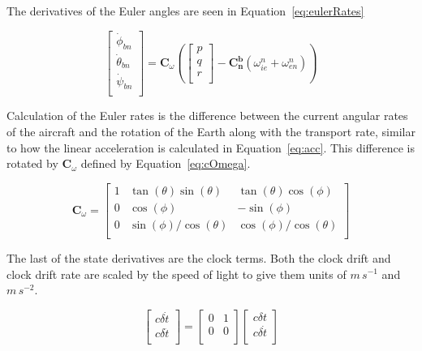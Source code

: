 The derivatives of the Euler angles are seen in Equation~\ref{eq:eulerRates}

\begin{equation}\label{eq:eulerRates}
    \begin{bmatrix}
        \dot{\phi}_{bn}   \\
        \dot{\theta}_{bn} \\
        \dot{\psi}_{bn}   \\
    \end{bmatrix} =
    \mathbf{C}_{\omega}
    \left(
    \begin{bmatrix}
            p \\
            q \\
            r \\
        \end{bmatrix} -
    \mathbf{C_n^b}\left(\omega_{ie}^n + \omega_{en}^n\right)
    \right)
\end{equation}

Calculation of the Euler rates is the difference between the current angular rates of the aircraft and the rotation of the Earth along with the transport rate, similar to how the linear acceleration is calculated in Equation~\ref{eq:acc}. This difference is rotated by \(\mathbf{C}_{\omega}\) defined by Equation~\ref{eq:cOmega}.

\begin{equation}\label{eq:cOmega}
    \mathbf{C}_{\omega} =
    \begin{bmatrix}
        1 & \tan(\theta)\sin(\theta)    & \tan(\theta)\cos(\phi)      \\
        0 & \cos(\phi)                  & -\sin(\phi)                 \\
        0 & {\sin(\phi)}/{\cos(\theta)} & {\cos(\phi)}/{\cos(\theta)} \\
    \end{bmatrix}
\end{equation}

The last of the state derivatives are the clock terms. Both the clock drift and clock drift rate are scaled by the speed of light to give them units of \( m \, s^{-1}\) and \( m \, s^{-2}\).

\begin{equation}\label{eq:clkRates}
    \begin{bmatrix}
        c\delta \dot{t} \\
        c\delta\ddot{t} \\
    \end{bmatrix} =
    \begin{bmatrix}
        0 & 1 \\
        0 & 0 \\
    \end{bmatrix}
    \begin{bmatrix}
        c\delta {t}    \\
        c\delta\dot{t} \\
    \end{bmatrix}
\end{equation}

